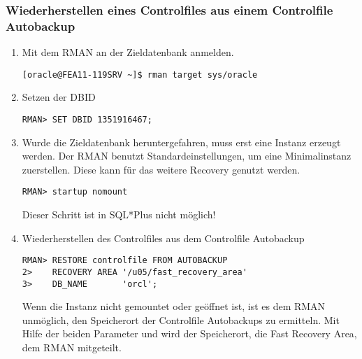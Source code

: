         \subsubsection{Wiederherstellen eines Controlfiles aus einem Controlfile Autobackup}
          \begin{enumerate}
            \item Mit dem RMAN an der Zieldatenbank anmelden.
              \begin{lstlisting}[caption={An der Zieldatenbank anmelden},label=admin1516,language=rman]
[oracle@FEA11-119SRV ~]$ rman target sys/oracle
              \end{lstlisting}
            \item Setzen der DBID
              \begin{lstlisting}[caption={Setzen der DBID},label=admin1517,language=rman]
RMAN> SET DBID 1351916467;
              \end{lstlisting}
            \item Wurde die Zieldatenbank heruntergefahren, muss erst eine Instanz erzeugt werden. Der RMAN benutzt Standardeinstellungen, um eine Minimalinstanz zuerstellen. Diese kann f\"ur das weitere Recovery genutzt werden.
              \begin{lstlisting}[caption={Zieldatenbank im RMAN in den NOMOUNT-Status bringen},label=admin1518,language=rman,alsolanguage=sqlplus]
RMAN> startup nomount
              \end{lstlisting}
              \begin{merke}
                Dieser Schritt ist in SQL*Plus nicht m\"oglich!
              \end{merke}
            \item Wiederherstellen des Controlfiles aus dem Controlfile Autobackup
              \begin{lstlisting}[caption={Wiederherstellen des Controlfiles},label=admin1519,language=rman]
RMAN> RESTORE controlfile FROM AUTOBACKUP
2>    RECOVERY AREA '/u05/fast_recovery_area'
3>    DB_NAME       'orcl';
              \end{lstlisting}
              \begin{merke}
                Wenn die Instanz nicht gemountet oder ge\"offnet ist, ist es dem
                RMAN unm\"oglich, den Speicherort der Controlfile Autobackups zu
                ermitteln. Mit Hilfe der beiden Parameter  und  wird der Speicherort, die Fast
                Recovery Area, dem RMAN mitgeteilt.

\end{merke}
\end{enumerate}
